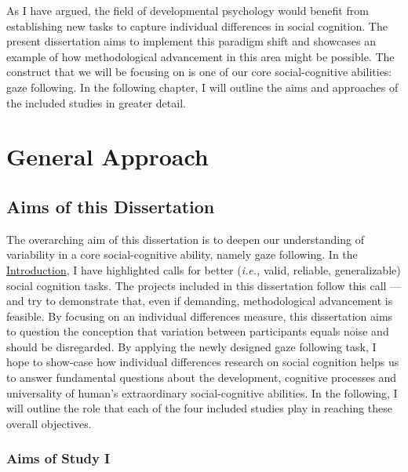\documentclass[
]{scrbook}
\begin{document}
As I have argued, the field of developmental psychology would benefit from establishing new tasks to capture individual differences in social cognition. The present dissertation aims to implement this paradigm shift and showcases an example of how methodological advancement in this area might be possible. The construct that we will be focusing on is one of our core social-cognitive abilities: gaze following. In the following chapter, I will outline the aims and approaches of the included studies in greater detail.

\chapter{General Approach}\label{approach}

\section{Aims of this Dissertation}\label{aimsgeneral}

The overarching aim of this dissertation is to deepen our understanding of variability in a core social-cognitive ability, namely gaze following. In the \hyperref[introduction]{Introduction}, I have highlighted calls for better (\emph{i.e.,} valid, reliable, generalizable) social cognition tasks. The projects included in this dissertation follow this call --- and try to demonstrate that, even if demanding, methodological advancement is feasible. By focusing on an individual differences measure, this dissertation aims to question the conception that variation between participants equals noise and should be disregarded. By applying the newly designed gaze following task, I hope to show-case how individual differences research on social cognition helps us to answer fundamental questions about the development, cognitive processes and universality of human's extraordinary social-cognitive abilities. In the following, I will outline the role that each of the four included studies play in reaching these overall objectives.

\subsection{Aims of Study I}\label{aimsI}
\end{document}
